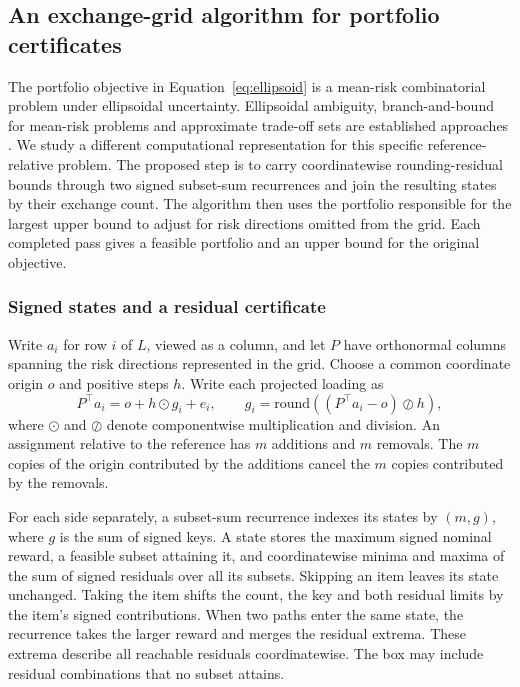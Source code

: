 \subsection{An exchange-grid algorithm for portfolio certificates}
\label{sec:exchange_grid}

The portfolio objective in Equation~\eqref{eq:ellipsoid} is a mean-risk
combinatorial problem under ellipsoidal uncertainty. Ellipsoidal ambiguity,
branch-and-bound for mean-risk problems and approximate trade-off sets are
established approaches
\citep{kurtz2018,buchheim2018,papadimitriouyannakakis2000}. We study a different
computational representation for this specific reference-relative problem.
The proposed step is to carry coordinatewise rounding-residual bounds through
two signed subset-sum recurrences and join the resulting states by their
exchange count. The algorithm then uses the portfolio responsible for the
largest upper bound to adjust for risk directions omitted from the grid.
Each completed pass gives a feasible portfolio and an upper bound for the
original objective.

\subsubsection{Signed states and a residual certificate}

Write $a_i$ for row $i$ of $L$, viewed as a column, and let $P$ have orthonormal
columns spanning the risk directions represented in the grid. Choose a common
coordinate origin $o$ and positive steps $h$. Write each projected loading as
\[
 P^\top a_i=o+h\odot g_i+e_i,\qquad
 g_i=\mathrm{round}\!\left((P^\top a_i-o)\oslash h\right),
\]
where $\odot$ and $\oslash$ denote componentwise multiplication and division.
An assignment relative to the reference has $m$ additions and $m$ removals.
The $m$ copies of the origin contributed by the additions cancel the $m$ copies
contributed by the removals.

For each side separately, a subset-sum recurrence indexes its states by
$(m,g)$, where $g$ is the sum of signed keys. A state stores the maximum signed
nominal reward, a feasible subset attaining it, and coordinatewise minima and
maxima of the sum of signed residuals over all its subsets. Skipping an item
leaves its state unchanged. Taking the item shifts the count, the key and both
residual limits by the item's signed contributions. When two paths enter the
same state, the recurrence takes the larger reward and merges the residual
extrema. These extrema describe all reachable residuals coordinatewise.
The box may include residual combinations that no subset attains.

